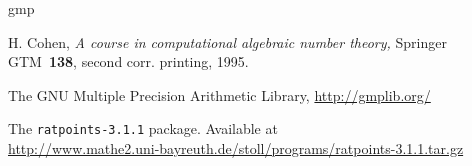 \documentclass[12pt,a4paper,oneside]{amsart}
\newcommand{\rpversion}{3.1.1} %
\begin{document}
\begin{thebibliography}{gmp}
\frenchspacing

  H. Cohen, \textit{A course in computational algebraic number theory,}
  Springer GTM~\textbf{138}, second corr. printing, 1995.

  The GNU Multiple Precision Arithmetic Library, \url{http://gmplib.org/}

  The \texttt{ratpoints-\rpversion} package. Available at \\
  \url{http://www.mathe2.uni-bayreuth.de/stoll/programs/ratpoints-\rpversion.tar.gz}

\end{thebibliography}
\end{document}
